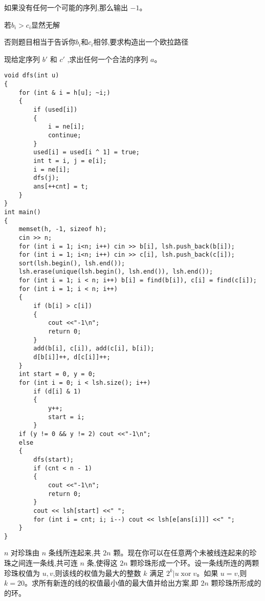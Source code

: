 \documentclass[a4paper, fontset=none]{ctexart}
\begin{document}
如果没有任何一个可能的序列,那么输出 $-1$。

若$b_i > c_i$显然无解

否则题目相当于告诉你$b_i$和$c_i$相邻,要求构造出一个欧拉路径

现给定序列 $b'$ 和 $ c'$ ,求出任何一个合法的序列 $a$。

\begin{verbatim}
void dfs(int u)
{
    for (int & i = h[u]; ~i;)
    {
        if (used[i])
        {
            i = ne[i];
            continue;
        }
        used[i] = used[i ^ 1] = true;
        int t = i, j = e[i];
        i = ne[i];
        dfs(j);
        ans[++cnt] = t;
    }
}
int main()
{
    memset(h, -1, sizeof h);
    cin >> n;
    for (int i = 1; i<n; i++) cin >> b[i], lsh.push_back(b[i]);
    for (int i = 1; i<n; i++) cin >> c[i], lsh.push_back(c[i]);
    sort(lsh.begin(), lsh.end());
    lsh.erase(unique(lsh.begin(), lsh.end()), lsh.end());
    for (int i = 1; i < n; i++) b[i] = find(b[i]), c[i] = find(c[i]);
    for (int i = 1; i < n; i++)
    {
        if (b[i] > c[i])
        {
            cout <<"-1\n";
            return 0;
        }
        add(b[i], c[i]), add(c[i], b[i]);
        d[b[i]]++, d[c[i]]++;
    }
    int start = 0, y = 0;
    for (int i = 0; i < lsh.size(); i++)
        if (d[i] & 1)
        {
            y++;
            start = i;
        }
    if (y != 0 && y != 2) cout <<"-1\n";
    else
    {
        dfs(start);
        if (cnt < n - 1)
        {
            cout <<"-1\n";
            return 0;
        }
        cout << lsh[start] <<" ";
        for (int i = cnt; i; i--) cout << lsh[e[ans[i]]] <<" ";
    }
}
\end{verbatim}

$n$ 对珍珠由 $n$ 条线所连起来,共 $2n$ 颗。现在你可以在任意两个未被线连起来的珍珠之间连一条线,共可连 $n$ 条,使得这 $2n$ 颗珍珠形成一个环。设一条线所连的两颗珍珠权值为 $u, v$,则该线的权值为最大的整数 $k$ 满足 $2 ^ k | u \operatorname{xor} v$。如果 $u=v$,则 $k=20$。求所有新连的线的权值最小值的最大值并给出方案,即 $2n$ 颗珍珠所形成的的环。
\end{document}
